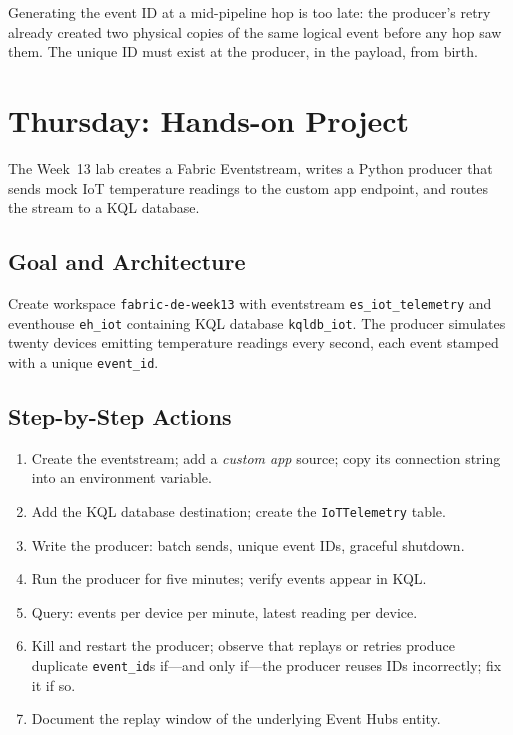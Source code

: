 \begin{pitfall}
Generating the event ID at a mid-pipeline hop is too late: the producer's retry already created two physical copies of the same logical event before any hop saw them. The unique ID must exist at the producer, in the payload, from birth.
\end{pitfall}

\section{Thursday: Hands-on Project}
The Week~13 lab creates a Fabric Eventstream, writes a Python producer that sends mock IoT temperature readings to the custom app endpoint, and routes the stream to a KQL database.

\subsection{Goal and Architecture}
Create workspace \texttt{fabric-de-week13} with eventstream \texttt{es\_iot\_telemetry} and eventhouse \texttt{eh\_iot} containing KQL database \texttt{kqldb\_iot}. The producer simulates twenty devices emitting temperature readings every second, each event stamped with a unique \texttt{event\_id}.

\subsection{Step-by-Step Actions}
\begin{enumerate}
    \item Create the eventstream; add a \emph{custom app} source; copy its connection string into an environment variable.
    \item Add the KQL database destination; create the \texttt{IoTTelemetry} table.
    \item Write the producer: batch sends, unique event IDs, graceful shutdown.
    \item Run the producer for five minutes; verify events appear in KQL.
    \item Query: events per device per minute, latest reading per device.
    \item Kill and restart the producer; observe that replays or retries produce duplicate \texttt{event\_id}s if---and only if---the producer reuses IDs incorrectly; fix it if so.
    \item Document the replay window of the underlying Event Hubs entity.
\end{enumerate}

